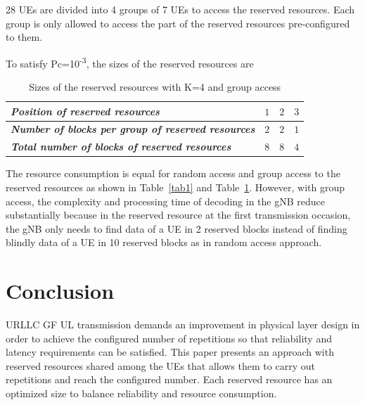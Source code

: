 \documentclass[conference]{IEEEtran}
\begin{document}
28 UEs are divided into 4 groups of 7 UEs to access the reserved resources. Each group is only allowed to access the part of the reserved resources pre-configured to them. 

To satisfy Pc=10\textsuperscript{-3}, the sizes of the reserved resources are

\begin{table}[htbp]
\caption{Sizes of the reserved resources with K=4 and group access}
\begin{center}
\begin{tabular}{|p{14em}|p{2em}|p{2em}|p{2em}|}
 \hline
 \textbf{\textit{Position of reserved resources}} & $1$ &$2$ &$3$ \\ 
 \hline
 \textbf{\textit{Number of blocks per group of reserved resources}} & $2$ &$2$ &$1$ \\
 \hline
\textbf{\textit{Total number of blocks of reserved resources}} & $8$ &$8$ &$4$ \\
 
 \hline
\end{tabular}
\label{tab3}
\end{center}
\end{table}

The resource consumption is equal for random access and group access to the reserved resources as shown in Table~\ref{tab1} and Table~\ref{tab3}. However, with group access, the complexity and processing time of decoding in the gNB reduce substantially because in the reserved resource at the first transmission occasion, the gNB only needs to find data of a UE in 2 reserved blocks instead of finding blindly data of a UE in 10 reserved blocks as in random access approach.

\section{Conclusion}\label{IV}

URLLC GF UL transmission demands an improvement in physical layer design in order to achieve the configured number of repetitions so that reliability and latency requirements can be  satisfied. This paper presents an approach with reserved resources shared among the UEs that allows them to carry out repetitions and reach the configured number. Each reserved resource has an optimized size to balance reliability and  resource consumption. 
\end{document}
